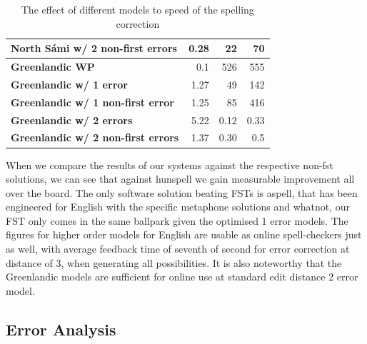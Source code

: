 \documentclass[a4paper,12pt]{article}
\begin{document}
\begin{table}
\begin{tabular}{|l|r|r|r|}
\bf North Sámi w/ 2 non-first errors & 0.28 & 22    & 70    \\
        \hline
        \bf Greenlandic WP    & 0.1  & 526 & 555\\
        \hline
        \bf Greenlandic w/ 1 error    & 1.27 & 49 & 142 \\
\bf Greenlandic w/ 1 non-first error  & 1.25 & 85 & 416 \\
       \bf Greenlandic w/ 2 errors    & 5.22 & 0.12 & 0.33 \\
\bf Greenlandic w/ 2 non-first errors & 1.37 & 0.30 & 0.5 \\
        \hline
    \end{tabular}
    \caption{The effect of different models to speed of the spelling
        correction \label{table:speed}}
\end{table}

When we compare the results of our systems against the respective non-fst
solutions, we can see that against hunspell we gain measurable improvement
all over the board. The only software solution beating FSTs is aspell, that
has been engineered for English with the specific metaphone solutions and
whatnot, our FST only comes in the same ballpark given the optimised 1 error
models. The figures for higher order models for English are usable as online
spell-checkers just as well, with average feedback time of seventh of second
for error correction at distance of 3, when generating all possibilities. It
is also noteworthy that the Greenlandic models are sufficient for online use
at standard edit distance 2 error model.

%

\subsection{Error Analysis}
\label{subsec:error-analysis}
\end{document}

